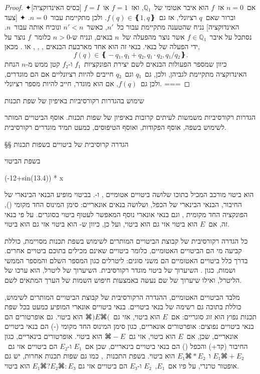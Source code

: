 \begin{proof}
  \mbox{}
  ✦[בסיס האינדוקציה] אם~$n=0$ אז~$f$ הוא איבר אטומי של~$ℚ₁$,
  ואז~$f=1$ או~$f=I$ וברור שאם~$q$ רציונלי, אז גם~$f(q)∈❴1,q❵$. ולכן
   מתקיימת עבור~$n=0$.
  ✦ [צעד האינדוקציה] נניח שהטענה  מתקיימת עבור כל~$n'$, כאשר~$n'<n$
  ונוכיח אותה עבור~$n$.
  נסתכל על איבר~$f∈ℚ₁$ אשר נוצר מהפעלה של~$n$ בנאים, ונניח ש-$n>0$ כלומר~$f$
  נוצר על ידי הפעלה של בנאי. בנאי זה הוא אחד מארבעת הבנאים ,
  , , או .
  מכאן, \[
    f(q)∈❴-q₁,q₁+q₂,q₁·q₂,q₁/q₂❵.
  \] כיוון שמספר הפעולות הבנאים לשם יצירת הפונקציות~$f₁$ ו-$f₂$ קטן ממש מ-$n$
  הנחת האינדוקציה מתקיימת לגביהן, ולכן, גם~$q₁$ וגם~$q₂$ חייבים להיות רציונליים
  אם הם מוגדרים, ולכן גם~$f(q)$, אם הוא מוגדר, חייב להיות מספר רציונלי.
  ===
\end{proof}

שימוש בהגדרות רקורסיביות באיפיון של שפת תכנות

הגדרות רקורסיביות משמשות לעיתים קרובות באיפיון של שפות תכנות. אוסף הביטויים
המותר לשימוש בשפה, אוסף הפקודות, ואוסף הטיפוסים, כמעט תמיד מוגדרים רקורסיבית.

§§ הגדרה קרוסיבית של ביטויים בשפות תכנות

בשפת  הביטוי
\begin{PASCAL}
(-12+sin(13.4)) * x
\end{PASCAL}
הוא ביטוי מורכב המכיל בתוכו שלושה ביטויים אטומיים , 
ו-. בביטוי מופיע הבנאי הבינארי של החיבור, הבנאי הבינארי של הכפל,
ושלושה בנאים אונאריים: סימן המינוס החד מקומי (), הפונקציה החד מקומית
, וגם בנאי אונארי נוסף המאפשר לעטוף ביטוי בסוגרים. על פי בנאי
זה, אם~$E$ הוא ביטוי אזי גם  הוא ביטוי, ועל כן, כיוון
ש- הוא ביטוי אזי גם  הוא ביטוי.

כל הגדרה רקורסיבית של קבוצת הביטויים המותרים לשימוש בשפת תכנות מסויימת, כוללת
קביעה מי הם הביטויים האטומיים, כלומר ביטויים שאינם מכילים בתוכם ביטויים אחרים.
בדרך כלל ביטויים האטומיים הם משני סוגים: ליטרלים כגון המספר השלם  והמספר
הממשי  ושמות, כגון . השיערוך של ביטוי מוגדר רקורסיבית. השיערוך
של ליטרל, הוא ערכו של הליטרל, ואילו שיערוך של שם נעשה באמצעות חיפוש השמות של
הערך המתאים לשם.

מלבד הביטויים האטומיים, ההגדרה הרקורסיבית של קבוצת הביטויים המותרים לשימוש,
כוללת בתוכה גם רשימה של בנאי ביטויים. בנאי ביטויים אונארי המופיע כמעט בכל שפת
תכנות נפוץ הוא זוג סוגריים: אם~$E$ הוא ביטוי, אזי גם~$⌘)E⌘($ הוא ביטוי.
גם אופרטורים הם בנאי ביטויים נפוצים: אופרטורים אונאריים, כגון סימן המינוס החד
מקומי (-) הם בנאי ביטויים אונאריים, שכן, אם~$E$ הוא ביטוי,
אזי גם~$⌘-E$ הוא ביטוי. אופרטורים בינאריים, כגון החיבור (קד+) והכפל () הם
בנאי ביטויים בינאריים, שכן אם~$E₁$ ו-$E₂$ הם ביטויים אזי גם~$E₁⌘+E₂$
ו~$E₁⌘*E₂$ הוא ביטוי. בשפת התכנות~\CPL, כמו גם שפות תכנות אחרות, יש גם
אופטור טרנרי, על פיו אם~$E₁$,~$E₂$ ו-$E₃$ הם ביטויים אזי גם
$E₁⌘?E₂⌘:E₃$ הוא ביטוי.

